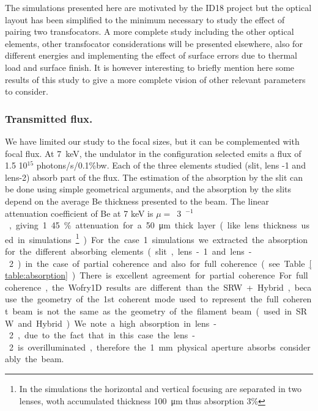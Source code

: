 \documentclass{iucr}              %
\begin{document}
The simulations presented here are motivated by the ID18 project but the optical layout has been simplified to the minimum necessary to study the effect of pairing two transfocators. A more complete study including the other optical elements, other transfocator considerations will be presented elsewhere, also for different energies and implementing the effect of surface errors due to thermal load and surface finish. It is however interesting to briefly mention here some results of this study to give a more complete vision of other relevant parameters to consider.

\subsubsection{Transmitted flux.} We have limited our study to the focal sizes, but it can be complemented with focal flux. At \SI{7}{keV}, the undulator in the configuration selected emits a flux of 1.5 10$^{15}$ photons/s/0.1\%bw. Each of the three elements studied (slit, lens -1 and lens-2) absorb part of the flux. The estimation of the absorption by the slit can be done using simple geometrical arguments, and the absorption by the slits depend on the average Be thickness presented to the beam. The linear attenuation coefficient of Be at 7 keV is $\mu=$~\SI{3}{\centi\meter$^{-1}$}, giving 1.45\% attenuation for a \SI{50}{\micro\meter} thick layer (like lens thickness used in simulations\footnote{In the simulations the horizontal and vertical focusing are separated in two lenses, woth accumulated thickness \SI{100}{\micro\meter} thus absorption 3\%}). For the case 1 simulations we extracted the absorption for the different absorbing elements (slit, lens-1 and lens-2) in the case of partial coherence and also for full coherence (see Table~\ref{table:absorption}).

There is excellent agreement for partial coherence. For full coherence, the Wofry1D results are different than the SRW+Hybrid, because the geometry of the 1st coherent mode used to represent the full coherent beam is not the same as the geometry of the filament beam (used in SRW and Hybrid). We note a high absorption in lens-2, due to the fact that in this case the lens-2 is overilluminated, therefore the \SI{1}{\milli\meter} physical aperture absorbs considerably the beam.
\end{document}
